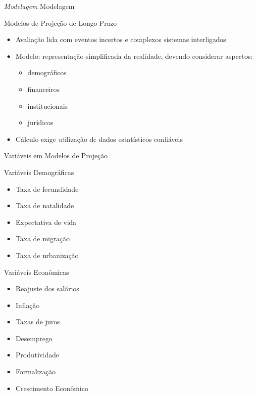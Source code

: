 \begin{frame}{\textit{Modelagem}}
  Modelagem
\end{frame}

\begin{frame}{Modelos de Projeção de Longo Prazo}
  \begin{block}{}
    \begin{itemize}
      \item Avaliação lida com eventos incertos e complexos sistemas
      interligados
      \item Modelo: representação simplificada da realidade, devendo
      considerar aspectos:
      \begin{itemize}
        \item demográficos
        \item financeiros
        \item institucionais
        \item jurídicos
      \end{itemize}
      \item Cálculo exige utilização de dados estatísticos confiáveis
    \end{itemize}
  \end{block}
\end{frame}

\begin{frame}{Variáveis em Modelos de Projeção}
\scriptsize
  \begin{block}{Variáveis Demográficas}
    \begin{itemize}
      \item Taxa de fecundidade
      \item Taxa de natalidade
      \item Expectativa de vida
      \item Taxa de migração
      \item Taxa de urbanização
    \end{itemize}
  \end{block}
  \pause
  \begin{block}{Variáveis Econômicas}
    \begin{itemize}
      \item Reajuste dos salários
      \item Inflação
      \item Taxas de juros
      \item Desemprego
      \item Produtividade
      \item Formalização
      \item Crescimento Econômico
    \end{itemize}
  \end{block}
\end{frame}

